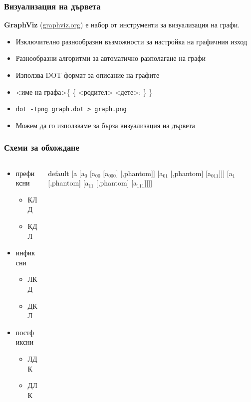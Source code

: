 \documentclass[alsotrans,beameroptions={aspectratio=169}]{beamerswitch}
\newcommand{\samplebintree}{%
      \begin{forest}
        default
        [a [a$_0$ [a$_{00}$ [a$_{000}$] [,phantom]] [a$_{01}$ [,phantom] [a$_{011}$]]] [a$_1$ [,phantom] [a$_{11}$ [,phantom] [a$_{111}$]]]]
      \end{forest}%
}
\begin{document}
\begin{frame}
  \frametitle{Визуализация на дървета}
  \textbf{GraphViz} (\url{graphviz.org}) е набор от инструменти за визуализация на графи.

  \begin{itemize}
  \item Изключително разнообразни възможности за настройка на графичния изход
  \item Разнообразни алгоритми за автоматично разполагане на графи
  \item Използва DOT формат за описание на графите
  \item {}<име-на графа>\tta\{ \{ <родител> \tta{->} <дете>\tta; \} \tta\}
  \item \tt{dot -Tpng graph.dot > graph.png}
  \item Можем да го използваме за бърза визуализация на дървета
  \end{itemize}

\end{frame}

\begin{frame}
  \frametitle{Схеми за обхождане}
  \begin{columns}[t,onlytextwidth]
    \begin{column}{0.35\textwidth}
      \begin{itemize}
      \item префиксни
        \begin{itemize}
        \item КЛД
        \item КДЛ
        \end{itemize}
      \item инфиксни
        \begin{itemize}
        \item ЛКД
        \item ДКЛ
        \end{itemize}
      \item постфиксни
        \begin{itemize}
        \item ЛДК
        \item ДЛК
        \end{itemize}
      \end{itemize}
    \end{column}
    \begin{column}{0.65\textwidth}
      \begin{center}
        \samplebintree
      \end{center}
    \end{column}
  \end{columns}
\end{frame}
\end{document}
